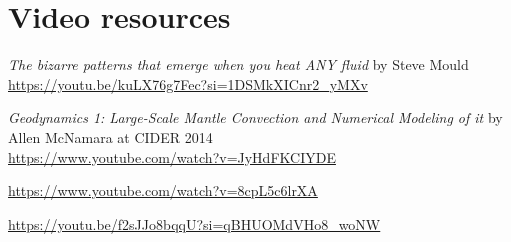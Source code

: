\section{Video resources}

{\it The bizarre patterns that emerge when you heat ANY fluid} by Steve Mould\\
\url{https://youtu.be/kuLX76g7Fec?si=1DSMkXICnr2_yMXv}

{\it Geodynamics 1: Large-Scale Mantle Convection and Numerical Modeling of it} by Allen McNamara at CIDER 2014\\
\url{https://www.youtube.com/watch?v=JyHdFKCIYDE}

\url{https://www.youtube.com/watch?v=8cpL5c6lrXA}

\url{https://youtu.be/f2sJJo8bqqU?si=qBHUOMdVHo8_woNW}




